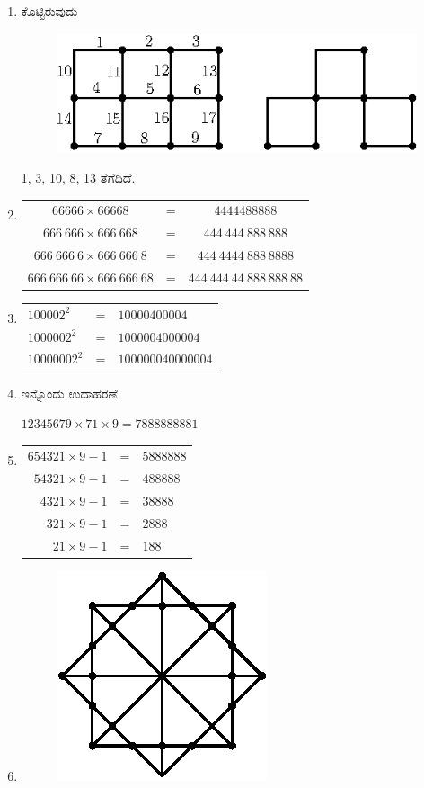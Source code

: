\begin{enumerate}
\item ಕೊಟ್ಟಿರುವುದು 
\begin{figure}[H]
\centering
\includegraphics{images/chap9/ans15.eps}
\end{figure}
1, 3, 10, 8, 13 ತೆಗೆದಿದೆ. 

\item 
\begin{tabular}[t]{ccc}
$66666\times 66668$ & = & $4444488888$\\
$666~666\times 666~668$ & = & $444~444~888~888$\\
$666~666~6\times 666~666~8$ & = & $444~4444~888~8888$\\
$666~666~66\times 666~666~68$ & = & $444~444~44~888~888~88$\\
\end{tabular}

\item 
\begin{tabular}[t]{lll}
$100002^{2}$ & = & $10000400004$\\
$1000002^{2}$ & = & $1000004000004$\\
$10000002^{2}$ & = & $100000040000004$\\
\end{tabular}

\item ಇನ್ನೊಂದು ಉದಾಹರಣೆ 

$12345679\times 71\times 9 = 7888888881$

\smallskip
\item 
\begin{tabular}[t]{rcl}
$654321\times 9 - 1$ & = & $5888888$\\
$54321\times 9 - 1$ & = & $488888$\\
$4321\times 9 - 1$ & = & $38888$\\
$321\times 9 - 1$ & = & $2888$\\
$21\times 9 - 1$ & = & $188$
\end{tabular}

\item 
\begin{figure}[H]
\centering
\includegraphics{images/chap9/ans20.eps}
\end{figure}


\end{enumerate}
